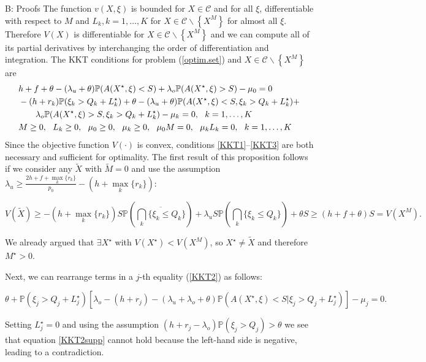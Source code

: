 \documentclass[opre,nonblindrev]{informs3}
\begin{document}
\begin{APPENDIX}{B: Proofs}
The function $v(X,\xi)$ is bounded for  $X\in\mathcal{C}$ and for all $\xi$,  differentiable with respect to $M$ and $L_k, k=1,\dots,K$ for $X\in\mathcal{C}\backslash\left\{X^M\right\}$ for almost all $\xi$. Therefore  $V(X)$ is differentiable for $X\in\mathcal{C}\backslash\left\{X^M\right\}$ and we can compute all of its partial derivatives by interchanging the order of differentiation and integration. The KKT conditions for problem (\ref{optim.set}) and $X\in\mathcal{C}\backslash\left\{X^M\right\}$ are
\begin{align}
&h + f +\theta -(\lambda_u+\theta)\mathbb{P}(A(X^\star,\xi)<S) + \lambda_o\mathbb{P}(A(X^\star,\xi)>S)-\mu_0=0 \label{KKT1}\\
&-(h+r_k)\mathbb{P}(\xi_k>Q_k+L^{\star}_k)+\theta -(\lambda_u+\theta)\mathbb{P}(A(X^\star,\xi)<S, \xi_k>Q_k+L^{\star}_k) + \notag\\
& \qquad \lambda_o\mathbb{P}(A(X^\star,\xi)>S, \xi_k>Q_k+L^{\star}_k)-\mu_k=0,~~k=1,\dots, K \label{KKT2}\\
& M\geq 0,~~L_k\geq 0,~~\mu_0\geq 0,~~\mu_k\geq 0,~~ \mu_0M=0,~~\mu_kL_k=0,~~k=1,\dots, K \label{KKT3}
\end{align}
Since the objective function $V(\cdot)$ is convex, conditions \eqref{KKT1}--\eqref{KKT3} are both necessary and sufficient for optimality. The  first result of this proposition follows if we consider any $\tilde X$ with $\tilde M=0$ and use the assumption $\lambda_u\geq\frac{2h+f+\underset{k}{\max}\{r_k\}}{p_0}-(h+\underset{k}{\max}\{r_k\})$:

$$V(\tilde X)\geq-(h+\underset{k}{\max}\{r_k\})S\mathbb{P}\left(\overline{\underset{k}{\bigcap}\{\xi_k\leq Q_k\}}\right)+\lambda_u S\mathbb{P}\left(\underset{k}{\bigcap}\{\xi_k\leq Q_k\}\right)+\theta S\geq(h+f+\theta)S=V(X^M).$$

\noindent We already argued that $\exists X^\star$ with $V(X^\star)<V(X^M)$, so $X^\star\neq\tilde X$ and therefore $M^\star>0$.

Next, we can rearrange terms in a $j$-th equality (\ref{KKT2}) as follows:

\begin{equation}\label{KKT2supp}
\theta+\mathbb{P}(\xi_j>Q_j+L^{\star}_j)\left[\lambda_o-(h+r_j) -(\lambda_u+\lambda_o+\theta)\mathbb{P}(A(X^\star,\xi)<S | \xi_j>Q_j+L^{\star}_j)\right]-\mu_j=0.
\end{equation}

\noindent Setting $L^{\star}_j=0$ and using the assumption  $(h+r_j-\lambda_o)\mathbb{P}\left(\xi_j>Q_j\right) > \theta$ we see that equation \eqref{KKT2supp} cannot hold because the left-hand side is negative, leading to a contradiction.


\end{APPENDIX}
\end{document}
